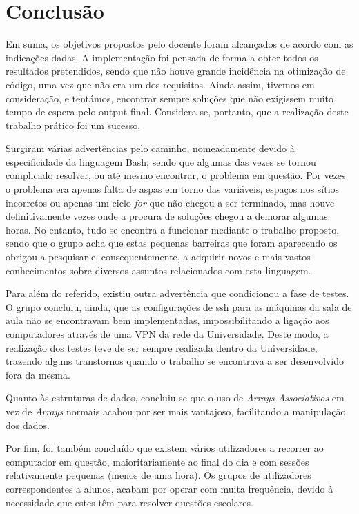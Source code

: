 \documentclass[10pt,portuguese]{article}
\begin{document}
\section{Conclusão}
\par Em suma, os objetivos propostos pelo docente foram alcançados de acordo com as indicações dadas. A implementação foi pensada de forma a obter todos os resultados pretendidos, sendo que não houve grande incidência na otimização de código, uma vez que não era um dos requisitos. Ainda assim, tivemos em consideração, e tentámos, encontrar sempre soluções que não exigissem muito tempo de espera pelo output final. Considera-se, portanto, que a realização deste trabalho prático foi um sucesso.
\par Surgiram várias advertências pelo caminho, nomeadamente devido à especificidade da linguagem Bash, sendo que algumas das vezes se tornou complicado resolver, ou até mesmo encontrar, o problema em questão. Por vezes o problema era apenas falta de aspas em torno das variáveis, espaços nos sítios incorretos ou apenas um ciclo \textit{for} que não chegou a ser terminado, mas houve definitivamente vezes onde a procura de soluções chegou a demorar algumas horas. No entanto, tudo se encontra a funcionar mediante o trabalho proposto, sendo que o grupo acha que estas pequenas barreiras que foram aparecendo os obrigou a pesquisar e, consequentemente, a adquirir novos e mais vastos conhecimentos sobre diversos assuntos relacionados com esta linguagem.
\par Para além do referido, existiu outra advertência que condicionou a fase de testes. O grupo concluiu, ainda, que as configurações de ssh para as máquinas da sala de aula não se encontravam bem implementadas, impossibilitando a ligação aos computadores através de uma VPN da rede da Universidade. Deste modo, a realização dos testes teve de ser sempre realizada dentro da Universidade, trazendo alguns transtornos quando o trabalho se encontrava a ser desenvolvido fora da mesma. 
\par Quanto às estruturas de dados, concluiu-se que o uso de \textit{Arrays Associativos} em vez de \textit{Arrays} normais acabou por ser mais vantajoso, facilitando a manipulação dos dados.
\par Por fim, foi também concluído que existem vários utilizadores a recorrer ao computador em questão, maioritariamente ao final do dia e com sessões relativamente pequenas (menos de uma hora). Os grupos de utilizadores correspondentes a alunos, acabam por operar com muita frequência, devido à necessidade que estes têm para resolver questões escolares.
\end{document}
